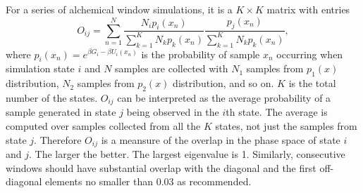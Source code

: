 For a series of alchemical window simulations, it is a $K \times K$ matrix with entries
\begin{equation}
O_{ij}=\sum\limits_{n=1}^{N}\frac{N_{i}p_{i}(x_{n})}{\sum\limits_{k=1}^{K}N_{k}p_{k}(x_{n})}\frac{p_{j}(x_{n})}{\sum\limits_{k=1}^{K}N_{k}p_{k}(x_{n})},
\end{equation}
where $p_{i}(x_{n})=e^{\beta G_{i}-\beta U_{i}(x_{n})}$ is the probability of sample $x_{n}$ occurring when simulation state $i$ and $N$ samples are collected with $N_{1}$ samples from $p_{1}(x)$ distribution, $N_{2}$ samples from $p_{2}(x)$ distribution, and so on. $K$ is the total number of the states. $O_{ij}$ can be interpreted as the average probability of a sample generated in state $j$ being observed in the $i$th state. The average is computed over samples collected from all the $K$ states, not just the samples from state $j$. Therefore $O_{ij}$ is a meansure of the overlap in the phase space of state $i$ and $j$. The larger the better. The largest eigenvalue is 1.
Similarly, consecutive windows should have substantial overlap with the diagonal and the first off-diagonal elements no smaller than 0.03 as recommended\cite{KlimovichJCAMD2015}. 